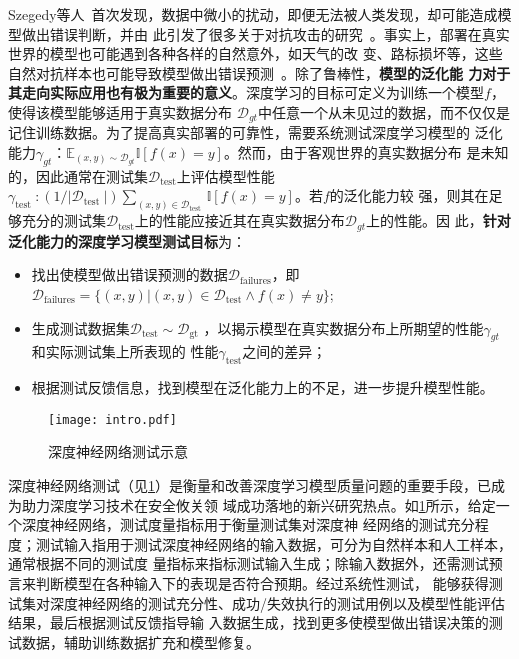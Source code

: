 Szegedy等人~\cite{szegedy2013intriguing}首次发现，数据中微小的扰动，即便无法被人类发现，却可能造成模型做出错误判断，并由
此引发了很多关于对抗攻击的研究~\cite{yuan2021meta}。事实上，部署在真实世界的模型也可能遇到各种各样的自然意外，如天气的改
变、路标损坏等，这些自然对抗样本也可能导致模型做出错误预测~\cite{hendrycks2021natural}。除了鲁棒性，\textbf{模型的泛化能
    力对于其走向实际应用也有极为重要的意义}。深度学习的目标可定义为训练一个模型${f}$，使得该模型能够适用于真实数据分布
$\mathcal D_{gt}$中任意一个从未见过的数据，而不仅仅是记住训练数据。为了提高真实部署的可靠性，需要系统测试深度学习模型的
泛化能力$\gamma_{gt}$：$\mathbb{E}_{(x, y) \sim \mathcal{D}_{g t}} \mathbb{I}[f(x)=y]$。然而，由于客观世界的真实数据分布
是未知的，因此通常在测试集$\mathcal D_{\text{test}}$上评估模型性能$\gamma_{\text {test }}:\left(1 /\left|\mathcal
    D_{\text {test }}\right|\right) \sum_{(x, y) \in \mathcal D_{\text {test }}} \mathbb{I}[f(x)=y]$。若${f}$的泛化能力较
强，则其在足够充分的测试集$\mathcal D_{\text{test}}$上的性能应接近其在真实数据分布$\mathcal D_{gt}$上的性能。因
此，\textbf{针对泛化能力的深度学习模型测试目标}为：
\begin{itemize}
    \item[（1）] 找出使模型做出错误预测的数据$\mathcal D_{\text{failures}}$，即
          $\mathcal D_{\text{failures}}=\{(x, y) | (x, y) \in \mathcal D_{\text{test}}
              \wedge f(x) \neq y\}$;
    \item[（2）] 生成测试数据集$\mathcal{D}_{\text{test}} \sim \mathcal{D}_{\text{gt}}$
          ，以揭示模型在真实数据分布上所期望的性能$\gamma_{gt}$和实际测试集上所表现的
          性能$\gamma_{\text{test}}$之间的差异；
    \item[（3）] 根据测试反馈信息，找到模型在泛化能力上的不足，进一步提升模型性能。
\end{itemize}

\begin{figure}[htp]
    \centering
    \texttt{[image: intro.pdf]}
    \caption{深度神经网络测试示意}
    \label{fig:ch1:intro}
\end{figure}

深度神经网络测试（见\cref{fig:ch1:intro}）是衡量和改善深度学习模型质量问题的重要手段，已成为助力深度学习技术在安全攸关领
域成功落地的新兴研究热点。如\cref{fig:ch1:intro}所示，给定一个深度神经网络，{测试度量指标}用于衡量测试集对深度神
经网络的测试充分程度；{测试输入}指用于测试深度神经网络的输入数据，可分为自然样本和人工样本，通常根据不同的测试度
量指标来指标测试输入生成；除输入数据外，还需{测试预言}来判断模型在各种输入下的表现是否符合预期。经过系统性测试，
能够获得测试集对深度神经网络的测试充分性、成功/失效执行的测试用例以及模型性能评估结果，最后根据{测试反馈}指导输
入数据生成，找到更多使模型做出错误决策的测试数据，辅助训练数据扩充和模型修复。

